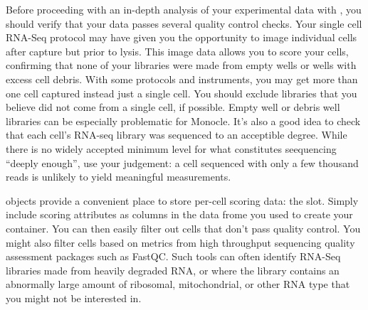 \documentclass[10pt,oneside]{article}\usepackage[]{graphicx}\usepackage[]{color}
\begin{document}
Before proceeding with an in-depth analysis of your experimental data with , you should verify that your data passes several quality control checks. Your single cell RNA-Seq protocol may have given you the opportunity to image individual cells after capture but prior to lysis. This image data allows you to score your cells, confirming that none of your libraries were made from empty wells or wells with excess cell debris.  With some protocols and instruments, you may get more than one cell captured instead just a single cell. You should exclude libraries that you believe did not come from a single cell, if possible. Empty well or debris well libraries can be especially problematic for Monocle. It's also a good idea to check that each cell's RNA-seq library was sequenced to an acceptible degree.  While there is no widely accepted minimum level for what constitutes seequencing ``deeply enough'', use your judgement: a cell sequenced with only a few thousand reads is unlikely to yield meaningful measurements.   

 objects provide a convenient place to store per-cell scoring data: the  slot.  Simply include scoring attributes as columns in the data frome you used to create your  container.  You can then easily filter out cells that don't pass quality control. You might also filter cells based on metrics from high throughput sequencing quality assessment packages such as FastQC. Such tools can often identify RNA-Seq libraries made from heavily degraded RNA, or where the library contains an abnormally large amount of ribosomal, mitochondrial, or other RNA type that you might not be interested in.
\end{document}
